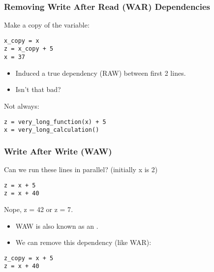 \documentclass[aspectratio=43]{beamer}
\newenvironment{changemargin}[1]{%
  \begin{list}{}{%
    \setlength{\topsep}{0pt}%
    \setlength{\leftmargin}{#1}%
    \setlength{\rightmargin}{1em}
    \setlength{\listparindent}{\parindent}%
    \setlength{\itemindent}{\parindent}%
    \setlength{\parsep}{\parskip}%
  }%
  \item[]}{\end{list}}
\begin{document}
\begin{frame}[fragile]
\frametitle{Removing Write After Read (WAR) Dependencies}
\begin{changemargin}{1.8cm}
Make a copy of the variable:
\begin{lstlisting}
x_copy = x
z = x_copy + 5
x = 37
\end{lstlisting}
\pause
{}
\begin{itemize}
\item Induced a true dependency (RAW) between first 2 lines.
\item Isn't that bad?
\end{itemize}
\pause
Not always:
\begin{lstlisting}
z = very_long_function(x) + 5
x = very_long_calculation()
\end{lstlisting}
\end{changemargin}
\end{frame}

\begin{frame}[fragile]
\frametitle{Write After Write (WAW)}
\begin{changemargin}{2.5cm}
Can we run these lines in parallel? (initially x is 2)
\begin{lstlisting}
z = x + 5
z = x + 40
\end{lstlisting}
\pause
\alert{Nope, z = 42 or z = 7}.\\[1em]
\begin{itemize}
\item WAW is also known as an .
\item We can remove this dependency (like WAR):
\end{itemize}
\pause
\begin{lstlisting}
z_copy = x + 5
z = x + 40
\end{lstlisting}
\end{changemargin}
\end{frame}
\end{document}
